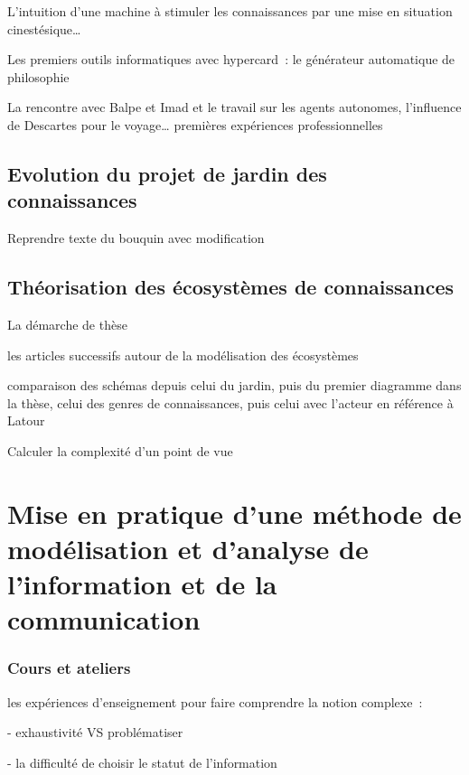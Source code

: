 \documentclass[
  a4paper,
  DIV=11,
  numbers=noendperiod]{scrreprt}
\begin{document}
L'intuition d'une machine à stimuler les connaissances par une mise en
situation cinestésique\ldots{}

Les premiers outils informatiques avec hypercard~: le générateur
automatique de philosophie

La rencontre avec Balpe et Imad et le travail sur les agents autonomes,
l'influence de Descartes pour le voyage\ldots{} premières expériences
professionnelles

\subsection{Evolution du projet de jardin des
connaissances}\label{evolution-du-projet-de-jardin-des-connaissances}

Reprendre texte du bouquin avec modification

\subsection{Théorisation des écosystèmes de
connaissances}\label{thuxe9orisation-des-uxe9cosystuxe8mes-de-connaissances}

La démarche de thèse

les articles successifs autour de la modélisation des écosystèmes

comparaison des schémas depuis celui du jardin, puis du premier
diagramme dans la thèse, celui des genres de connaissances, puis celui
avec l'acteur en référence à Latour

Calculer la complexité d'un point de vue

\section{Mise en pratique d'une méthode de modélisation et d'analyse de
l'information et de la
communication}\label{mise-en-pratique-dune-muxe9thode-de-moduxe9lisation-et-danalyse-de-linformation-et-de-la-communication}

\subsubsection{Cours et ateliers}\label{cours-et-ateliers}

les expériences d'enseignement pour faire comprendre la notion
complexe~:

- exhaustivité VS problématiser

- la difficulté de choisir le statut de l'information
\end{document}
